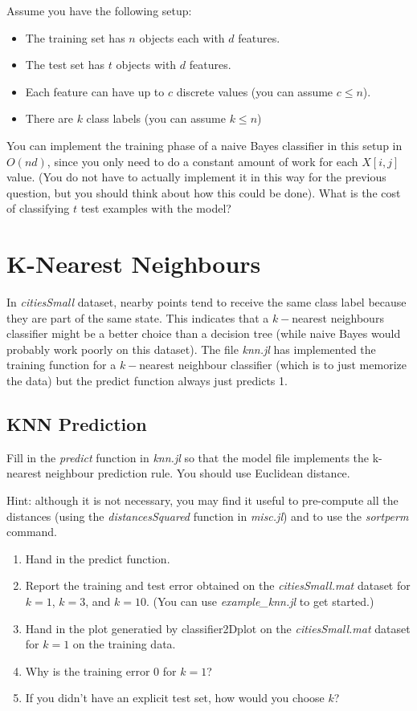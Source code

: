 \documentclass{article}
\def\blu#1{{\color{blu}#1}}
\def\items#1{\begin{itemize}#1\end{itemize}}
\def\enum#1{\begin{enumerate}#1\end{enumerate}}
\begin{document}
Assume you have the following setup:
\items{
\item The training set has $n$ objects each with $d$ features.
\item The test set has $t$ objects with $d$ features.
\item Each feature can have up to $c$ discrete values (you can assume $c \leq n$).
\item There are $k$ class labels (you can assume $k \leq n$)
}
You can implement the training phase of a naive Bayes classifier in this setup in $O(nd)$, since you only need to do a constant amount of work for each $X[i,j]$ value. (You do not have to actually implement it in this way for the previous question, but you should think about how this could be done). \blu{What is the cost of classifying $t$ test examples with the model?}




\section{K-Nearest Neighbours}


In \emph{citiesSmall} dataset, nearby points tend to receive the same class label because they are part of the same state. This indicates that a $k-$nearest neighbours classifier might be a better choice than a decision tree (while naive Bayes would probably work poorly on this dataset). The file \emph{knn.jl} has implemented the training function for a $k-$nearest neighbour classifier (which is to just memorize the data) but the predict function always just predicts 1.


\subsection{KNN Prediction}

Fill in the \emph{predict} function in \emph{knn.jl} so that the model file implements the k-nearest neighbour prediction rule. You should use Euclidean distance. 

Hint: although it is not necessary, you may find it useful to pre-compute all the distances (using the \emph{distancesSquared} function in \emph{misc.jl}) and to use the \emph{sortperm} command.
\blu{
\enum{
\item Hand in the predict function. 
\item Report  the training and test error obtained on the \emph{citiesSmall.mat} dataset for $k=1$, $k=3$, and $k=10$. (You can use \emph{example\_knn.jl} to get started.)
\item Hand in the plot generatied by {classifier2Dplot} on the \emph{citiesSmall.mat} dataset for $k=1$ on the training data. \item Why is the training error $0$ for $k=1$?
\item If you didn't have an explicit test set, how would you choose $k$?
}
}
\end{document}
